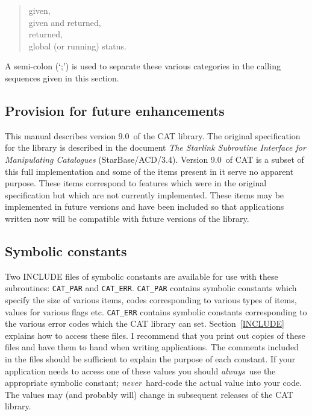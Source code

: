 \documentclass[11pt,twoside]{starlink}
\providecommand{\CATversion}{9.0~}
\begin{document}
\begin{verse}
given,  \\
given and returned,  \\
returned,  \\
global (or running) status.
\end{verse}

A semi-colon (`;') is used to separate these various categories in the
calling sequences given in this section.


\subsection{Provision for future enhancements}

This manual describes version \CATversion of the CAT library.  The
original specification for the library is described in the document \textit{The Starlink Subroutine Interface for Manipulating Catalogues}\/
(StarBase/ACD/3.4)\cite{STARBASE34}.  Version \CATversion of CAT is a
subset of this full implementation and some of the items present in it
serve no apparent purpose.  These items correspond to features which were
in the original specification but which are not currently implemented.
These items may be implemented in future versions and have been included
so that applications written now will be compatible with future versions
of the library.

\subsection{Symbolic constants}

Two INCLUDE files of symbolic constants are available for use with these
subroutines: \texttt{CAT\_PAR} and \texttt{CAT\_ERR}. \texttt{CAT\_PAR} contains
symbolic constants which specify the size of various items, codes
corresponding to various types of items, values for various flags etc.
\texttt{CAT\_ERR} contains symbolic constants corresponding to the various
error codes which the CAT library can set. Section~\ref{INCLUDE}
explains how to access these files. I recommend that you print out
copies of these files and have them to hand when writing applications.
The comments included in the files should be sufficient to explain the
purpose of each constant. If your application needs to access one of
these values you should \textit{always}\, use the appropriate symbolic
constant; \textit{never}\, hard-code the actual value into your code.
The values may (and probably will) change in subsequent releases of
the CAT library.
\end{document}
